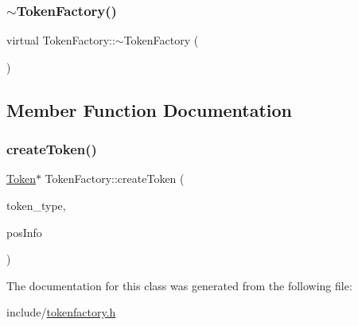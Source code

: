 \subsubsection{\texorpdfstring{$\sim$\+Token\+Factory()}{~TokenFactory()}}
{\footnotesize\ttfamily virtual Token\+Factory\+::$\sim$\+Token\+Factory (\begin{DoxyParamCaption}{ }\end{DoxyParamCaption})\hspace{0.3cm}{\ttfamily [virtual]}}



\subsection{Member Function Documentation}
\mbox{\label{classTokenFactory_a8cd2afd2f2a645e6ad542a6b10d2ea6b}} 
\subsubsection{\texorpdfstring{create\+Token()}{createToken()}}
{\footnotesize\ttfamily \hyperlink{classToken}{Token}$\ast$ Token\+Factory\+::create\+Token (\begin{DoxyParamCaption}\item[{\hyperlink{statics_8h_adb8e9416fa8b5ea4961e9f171db14133}{T\+O\+K\+E\+N\+\_\+\+T\+Y\+PE}}]{token\+\_\+type,  }\item[{\hyperlink{classPosInfo}{Pos\+Info}}]{pos\+Info }\end{DoxyParamCaption})}



The documentation for this class was generated from the following file\+:\begin{DoxyCompactItemize}
\item 
include/\hyperlink{tokenfactory_8h}{tokenfactory.\+h}\end{DoxyCompactItemize}
